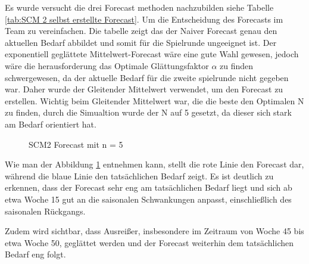 \documentclass[a4paper,12pt]{article}
\begin{document}
Es wurde versucht die drei Forecast methoden nachzubilden siehe Tabelle \ref{tab:SCM 2 selbst erstellte Forecast}. 
Um die Entscheidung des Forecasts im Team zu vereinfachen.
Die tabelle zeigt das der Naiver Forecast genau den aktuellen Bedarf abbildet und somit für die Spielrunde ungeeignet ist.
Der exponentiell geglättete Mittelwert-Forecast wäre eine gute Wahl gewesen,
jedoch wäre die herausforderung das Optimale Glättungsfaktor $\alpha$ zu finden schwergewesen, da der aktuelle Bedarf für die zweite spielrunde nicht gegeben war.
Daher wurde der Gleitender Mittelwert verwendet, um den Forecast zu erstellen.
Wichtig beim Gleitender Mittelwert war, die die beste den Optimalen N zu finden,
durch die Simualtion wurde der N auf 5 gesetzt, da dieser sich stark am Bedarf orientiert hat.
\begin{figure}[H]
    \centering
    \caption{SCM2 Forecast mit n = 5}
    \label{fig:SCM2 Forecast mit n = 5}
\end{figure}
Wie man der Abbildung \ref{fig:SCM2 Forecast mit n = 5} entnehmen kann,
stellt die rote Linie den Forecast dar, während die blaue Linie den tatsächlichen Bedarf zeigt.
Es ist deutlich zu erkennen, dass der Forecast sehr eng am tatsächlichen Bedarf liegt und sich ab etwa Woche 15 gut an die saisonalen Schwankungen anpasst, einschließlich des saisonalen Rückgangs.

Zudem wird sichtbar, dass Ausreißer, insbesondere im Zeitraum von Woche 45 bis etwa Woche 50, geglättet werden und der Forecast weiterhin dem tatsächlichen Bedarf eng folgt.

\end{document}
